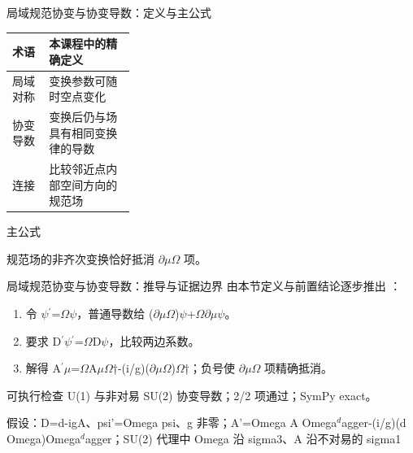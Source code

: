 \begin{frame}[t]{局域规范协变与协变导数：定义与主公式}
\footnotesize\begin{tabularx}{\linewidth}{p{0.30\linewidth}Y}
\toprule 术语 & 本课程中的精确定义\\\midrule
{} 局域对称 & 变换参数可随时空点变化\\
 协变导数 & 变换后仍与场具有相同变换律的导数\\
 连接 & 比较邻近点内部空间方向的规范场\\
\bottomrule\end{tabularx}\vspace{0.15cm}
\begin{block}{ 主公式}\centering{}\end{block}
规范场的非齐次变换恰好抵消 \ensuremath{\partial}\ensuremath{\mu}\ensuremath{\Omega} 项。
\end{frame}

\begin{frame}[t]{局域规范协变与协变导数：推导与证据边界}
\footnotesize
{}\quad 由本节定义与前置结论逐步推出 ：
\begin{enumerate}
\item 令 \ensuremath{\psi}\ensuremath{^{\prime}}=\ensuremath{\Omega}\ensuremath{\psi}，普通导数给 (\ensuremath{\partial}\ensuremath{\mu}\ensuremath{\Omega})\ensuremath{\psi}+\ensuremath{\Omega}\ensuremath{\partial}\ensuremath{\mu}\ensuremath{\psi}。
\item 要求 D\ensuremath{^{\prime}}\ensuremath{\psi}\ensuremath{^{\prime}}=\ensuremath{\Omega}D\ensuremath{\psi}，比较两边系数。
\item 解得 A\ensuremath{^{\prime}}\ensuremath{\mu}=\ensuremath{\Omega}A\ensuremath{\mu}\ensuremath{\Omega}†-(i/\allowbreak{}g)(\ensuremath{\partial}\ensuremath{\mu}\ensuremath{\Omega})\ensuremath{\Omega}†；负号使 \ensuremath{\partial}\ensuremath{\mu}\ensuremath{\Omega} 项精确抵消。
\end{enumerate}\begin{block}{可执行检查}
\quad U(1) 与非对易 SU(2) 协变导数；2/2 项通过；SymPy exact。
\par\scriptsize 假设：D=d-igA、psi'=Omega psi、g 非零；A'=Omega A Omega\ensuremath{^{d}}agger-(i/\allowbreak{}g)(d Omega)Omega\ensuremath{^{d}}agger；SU(2) 代理中 Omega 沿 sigma3、A 沿不对易的 sigma1
\end{block}
\end{frame}

